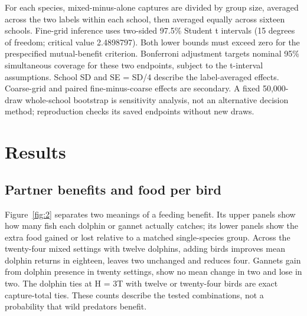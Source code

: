 \documentclass[10pt,a4paper,twocolumn]{article}
\begin{document}
For each species, mixed-minus-alone captures are divided by group size, averaged across the two labels within each school, then averaged equally across sixteen schools. Fine-grid inference uses two-sided 97.5\% Student t intervals (15 degrees of freedom; critical value 2.4898797). Both lower bounds must exceed zero for the prespecified mutual-benefit criterion. Bonferroni adjustment targets nominal 95\% simultaneous coverage for these two endpoints, subject to the t-interval assumptions. School SD and SE = SD/4 describe the label-averaged effects. Coarse-grid and paired fine-minus-coarse effects are secondary. A fixed 50,000-draw whole-school bootstrap is sensitivity analysis, not an alternative decision method; reproduction checks its saved endpoints without new draws.

\section{Results}
\subsection{Partner benefits and food per bird}
Figure~\ref{fig:2} separates two meanings of a feeding benefit. Its upper panels show how many fish each dolphin or gannet actually catches; its lower panels show the extra food gained or lost relative to a matched single-species group. Across the twenty-four mixed settings with twelve dolphins, adding birds improves mean dolphin returns in eighteen, leaves two unchanged and reduces four. Gannets gain from dolphin presence in twenty settings, show no mean change in two and lose in two. The dolphin ties at H = 3T with twelve or twenty-four birds are exact capture-total ties. These counts describe the tested combinations, not a probability that wild predators benefit.
\end{document}
